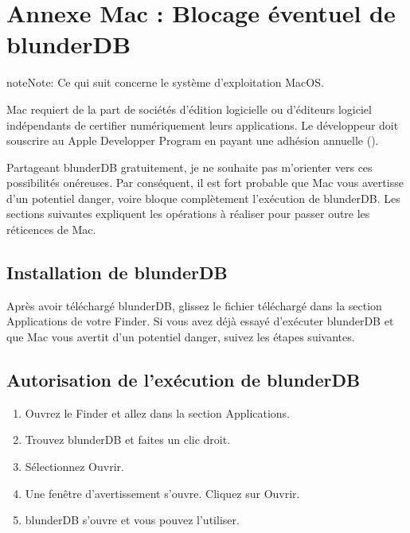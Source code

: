 \documentclass[letterpaper,10pt,french]{sphinxmanual}
\begin{document}
\sphinxstepscope


\section{Annexe Mac : Blocage éventuel de blunderDB}
\label{\detokenize{annexe_mac_securite:annexe-mac-blocage-eventuel-de-blunderdb}}\label{\detokenize{annexe_mac_securite:annexe-mac-malware}}\label{\detokenize{annexe_mac_securite::doc}}
\begin{sphinxadmonition}{note}{Note:}
\sphinxAtStartPar
Ce qui suit concerne le système d’exploitation MacOS.
\end{sphinxadmonition}

\sphinxAtStartPar
Mac requiert de la part de sociétés d’édition logicielle ou
d’éditeurs logiciel indépendants de certifier numériquement leurs applications.
Le développeur doit souscrire au Apple Developper Program en payant une adhésion annuelle ().

\sphinxAtStartPar
Partageant blunderDB gratuitement, je ne souhaite pas m’orienter vers ces
possibilités onéreuses. Par conséquent, il est fort probable que Mac vous
avertisse d’un potentiel danger, voire bloque complètement l’exécution de
blunderDB. Les sections suivantes expliquent les opérations à réaliser pour
passer outre les réticences de Mac.


\subsection{Installation de blunderDB}
\label{\detokenize{annexe_mac_securite:installation-de-blunderdb}}
\sphinxAtStartPar
Après avoir téléchargé blunderDB, glissez le fichier téléchargé dans la section
Applications de votre Finder. Si vous avez déjà essayé d’exécuter blunderDB et
que Mac vous avertit d’un potentiel danger, suivez les étapes suivantes.


\subsection{Autorisation de l’exécution de blunderDB}
\label{\detokenize{annexe_mac_securite:autorisation-de-l-execution-de-blunderdb}}\begin{enumerate}
%
\item {} 
\sphinxAtStartPar
Ouvrez le Finder et allez dans la section Applications.

\item {} 
\sphinxAtStartPar
Trouvez blunderDB et faites un clic droit.

\item {} 
\sphinxAtStartPar
Sélectionnez Ouvrir.

\item {} 
\sphinxAtStartPar
Une fenêtre d’avertissement s’ouvre. Cliquez sur Ouvrir.

\item {} 
\sphinxAtStartPar
blunderDB s’ouvre et vous pouvez l’utiliser.

\end{enumerate}
\end{document}
